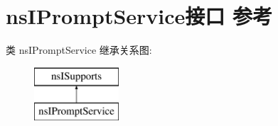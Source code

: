 \hypertarget{interfacens_i_prompt_service}{}\section{ns\+I\+Prompt\+Service接口 参考}
\label{interfacens_i_prompt_service}
类 ns\+I\+Prompt\+Service 继承关系图\+:\begin{figure}[H]
\begin{center}
\leavevmode
\includegraphics[height=2.000000cm]{interfacens_i_prompt_service}
\end{center}
\end{figure}

